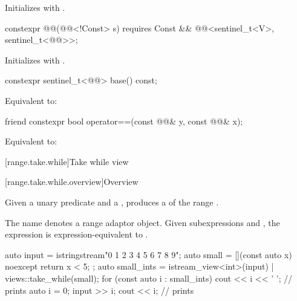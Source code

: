 \begin{itemdescr}
\pnum
\effects
Initializes  with .
\end{itemdescr}

%
\begin{itemdecl}
constexpr @@(@@<!Const> s)
  requires Const && @@<sentinel_t<V>, sentinel_t<@@>>;
\end{itemdecl}

\begin{itemdescr}
\pnum
\effects
Initializes  with .
\end{itemdescr}

%
\begin{itemdecl}
constexpr sentinel_t<@@> base() const;
\end{itemdecl}

\begin{itemdescr}
\pnum
\effects
Equivalent to: 
\end{itemdescr}

%
\begin{itemdecl}
friend constexpr bool operator==(const @@& y, const @@& x);
\end{itemdecl}

\begin{itemdescr}
\pnum
\effects
Equivalent to:
\end{itemdescr}

[range.take.while]{Take while view}

[range.take.while.overview]{Overview}

\pnum
Given a unary predicate  and a  ,
 produces a 
of the range .

%
\pnum
The name  denotes
a range adaptor object.
Given subexpressions  and ,
the expression 
is expression-equivalent to .

\pnum
\begin{example}
\begin{codeblock}
auto input = istringstream{"0 1 2 3 4 5 6 7 8 9"};
auto small = [](const auto x) noexcept { return x < 5; };
auto small_ints = istream_view<int>(input) | views::take_while(small);
for (const auto i : small_ints) {
  cout << i << ' ';                             // prints 
}
auto i = 0;
input >> i;
cout << i;                                      // prints 
\end{codeblock}
\end{example}

